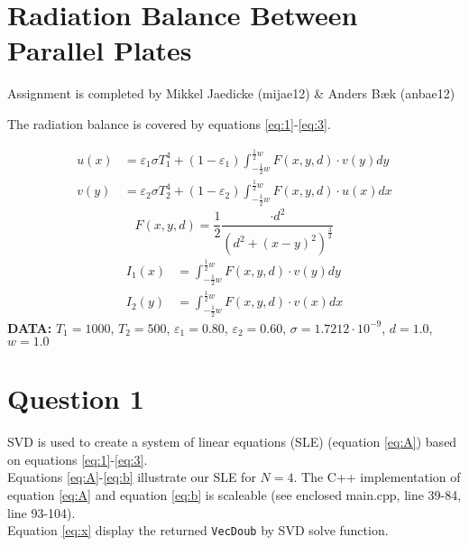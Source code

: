 \section*{Radiation Balance Between Parallel Plates}
Assignment is completed by Mikkel Jaedicke (mijae12) \& Anders Bæk (anbae12)

The radiation balance is covered by equations \ref{eq:1}-\ref{eq:3}. 

\begin{equation}
\begin{align*}
u\left( x \right) &=\varepsilon _{ 1 }\sigma { T }_{ 1 }^{ 4 }+\left( 1-\varepsilon _{ 1 } \right) \int _{ -\frac { 1 }{ 2 } w }^{ \frac { 1 }{ 2 } w } F\left( x,y,d \right) \cdot v\left( y \right) { dy }\\ 
v\left( y \right) &=\varepsilon _{ 2 }\sigma { T }_{ 2 }^{ 4 }+\left( 1-\varepsilon _{ 2 } \right) \int _{ -\frac { 1 }{ 2 } w }^{ \frac { 1 }{ 2 } w } F\left( x,y,d \right) \cdot u\left( x \right) { dx }
\end{align*}
\label{eq:1}
\end{equation}
\begin{equation}
F\left( x,y,d \right) =  \frac {1}{2}\frac {\cdot d^2 }{ \left( d^2+\left( x-y \right)^2 \right)^{\frac{3}{2}}} 
\label{eq:2}
\end{equation}
\begin{equation}
\begin{align*}
I_{ 1 }\left( x \right) &=\int _{ -\frac { 1 }{ 2 } w }^{ \frac { 1 }{ 2 } w } F\left( x,y,d \right)\cdot v\left( y \right) { dy }
\\
I_{ 2 }\left( y \right) &=\int _{ -\frac { 1 }{ 2 } w }^{ \frac { 1 }{ 2 } w } F\left( x,y,d \right)\cdot v\left( x \right) { dx }
\end{align*}
\label{eq:3}
\end{equation}
\textbf{DATA:} \( T_1 = 1000\), \(  T_2=500 \), \(  \varepsilon_1 = 0.80 \), \(  \varepsilon_2 = 0.60 \), \(  \sigma = 1.7212\cdot 10^{-9} \), \( d=1.0  \), \(  w=1.0 \)
\section*{Question 1}

SVD is used to create a system of linear equations (SLE) (equation \ref{eq:A}) based on equations \ref{eq:1}-\ref{eq:3}. \\
Equations \ref{eq:A}-\ref{eq:b} illustrate our SLE for \( N = 4 \).
The C++ implementation of equation \ref{eq:A} and equation \ref{eq:b} is scaleable (see enclosed main.cpp, line 39-84, line 93-104). \\
Equation \ref{eq:x} display the returned \texttt{VecDoub} by SVD solve function. 

